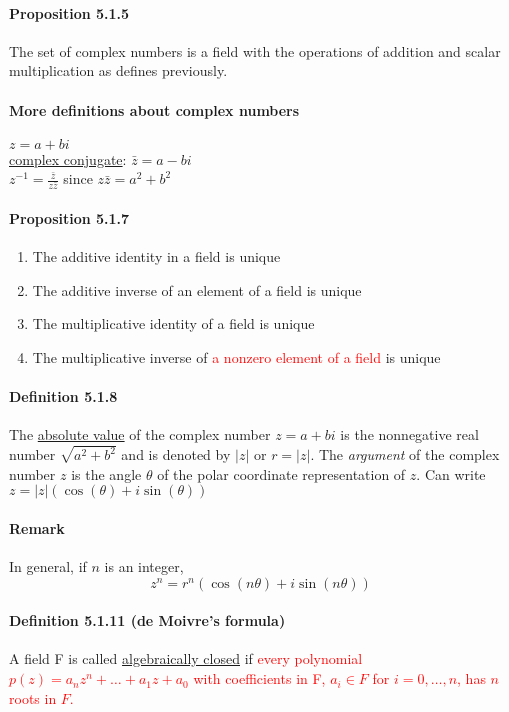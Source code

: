 \documentclass[11pt]{article}
\newcommand{\ti}[1]{\textit{#1}}
\newcommand{\under}[1]{\underline{#1}}
\begin{document}
{\paragraph{Proposition 5.1.5} The set of complex numbers is a field with the operations of addition and scalar multiplication as defines previously.
\paragraph{More definitions about complex numbers}
$z = a + bi$\\
\under{complex conjugate}: $\bar{z} = a - bi$\\
$z^{-1} = \frac{\bar{z}}{z\bar{z}}$ since $z\bar{z} = a^2 + b^2$
\paragraph{Proposition 5.1.7}
\begin{enumerate}
	\item The additive identity in a field is unique
	\item The additive inverse of an element of a field is unique
	\item The multiplicative identity of a field is unique
	\item The multiplicative inverse of \textcolor{red}{a nonzero element of a field} is unique
\end{enumerate}
\paragraph{Definition 5.1.8}
The \under{absolute value} of the complex number $z = a+bi$ is the nonnegative real number $\sqrt{a^2 + b^2}$ and is denoted by $|z|$ or $r = |z|$. The \ti{argument} of the complex number $z$ is the angle $\theta$ of the polar coordinate representation of $z$. Can write $z = |z|(\cos (\theta) + i\sin(\theta))$
\paragraph{Remark}
In general, if $n$ is an integer,
$$z^n = r^n(\cos(n\theta) + i\sin(n\theta))$$ 
\paragraph{Definition 5.1.11 (de Moivre's formula)}
A field F is called \under{algebraically closed} if \textcolor{red}{every polynomial $p(z) = a_nz^n + \hdots + a_1z + a_0$ with coefficients in F, $a_i \in F$ for $i = 0,\hdots,n$, has $n$ roots in $F$.}
}
\end{document}

